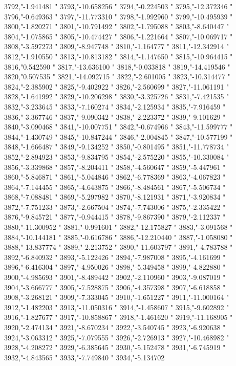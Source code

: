 3792,"-1.941481
"
3793,"-10.658256
"
3794,"-0.224503
"
3795,"-12.372346
"
3796,"-0.649363
"
3797,"-11.773310
"
3798,"-1.992960
"
3799,"-10.495939
"
3800,"-1.820271
"
3801,"-10.791492
"
3802,"-1.795088
"
3803,"-8.640447
"
3804,"-1.075865
"
3805,"-10.474427
"
3806,"-1.221664
"
3807,"-10.069717
"
3808,"-3.597273
"
3809,"-8.947748
"
3810,"-1.164777
"
3811,"-12.342914
"
3812,"-1.910550
"
3813,"-10.813182
"
3814,"-1.147650
"
3815,"-10.964415
"
3816,"0.542590
"
3817,"-13.636100
"
3818,"-0.033818
"
3819,"-14.419546
"
3820,"0.507535
"
3821,"-14.092715
"
3822,"-2.601005
"
3823,"-10.314477
"
3824,"-2.385902
"
3825,"-9.402922
"
3826,"-2.560699
"
3827,"-11.061191
"
3828,"-1.641992
"
3829,"-10.206298
"
3830,"-3.325726
"
3831,"-7.421535
"
3832,"-3.233645
"
3833,"-7.160274
"
3834,"-2.125934
"
3835,"-7.916459
"
3836,"-3.367746
"
3837,"-9.090342
"
3838,"-2.223372
"
3839,"-9.101629
"
3840,"-3.090468
"
3841,"-10.007751
"
3842,"-0.674966
"
3843,"-11.599777
"
3844,"-1.430749
"
3845,"-10.847244
"
3846,"-2.004845
"
3847,"-10.577199
"
3848,"-1.666487
"
3849,"-9.134252
"
3850,"-0.801495
"
3851,"-11.778734
"
3852,"-2.894923
"
3853,"-9.834795
"
3854,"-2.575220
"
3855,"-10.330084
"
3856,"-3.339868
"
3857,"-8.204411
"
3858,"-4.560647
"
3859,"-5.447961
"
3860,"-5.846871
"
3861,"-5.044846
"
3862,"-6.778369
"
3863,"-4.067823
"
3864,"-7.144455
"
3865,"-4.643875
"
3866,"-8.484561
"
3867,"-5.506734
"
3868,"-7.088481
"
3869,"-5.297982
"
3870,"-8.121931
"
3871,"-3.920834
"
3872,"-7.751233
"
3873,"-2.667504
"
3874,"-7.743006
"
3875,"-2.335422
"
3876,"-9.845721
"
3877,"-0.944415
"
3878,"-9.867390
"
3879,"-2.112337
"
3880,"-11.300952
"
3881,"-0.991601
"
3882,"-12.175827
"
3883,"-3.091568
"
3884,"-10.144181
"
3885,"-0.616786
"
3886,"-12.210440
"
3887,"-1.058080
"
3888,"-13.837774
"
3889,"-2.213752
"
3890,"-11.603797
"
3891,"-4.783788
"
3892,"-6.840932
"
3893,"-5.122426
"
3894,"-7.987008
"
3895,"-4.161699
"
3896,"-6.416304
"
3897,"-4.950026
"
3898,"-5.349458
"
3899,"-4.822880
"
3900,"-4.985693
"
3901,"-8.489442
"
3902,"-2.110960
"
3903,"-9.087019
"
3904,"-3.666777
"
3905,"-7.528875
"
3906,"-4.357398
"
3907,"-6.618858
"
3908,"-3.268121
"
3909,"-7.333045
"
3910,"-1.651227
"
3911,"-11.000164
"
3912,"-1.482203
"
3913,"-11.050316
"
3914,"-1.458607
"
3915,"-9.602892
"
3916,"-1.827677
"
3917,"-10.858867
"
3918,"-1.461620
"
3919,"-11.168905
"
3920,"-2.474134
"
3921,"-8.670234
"
3922,"-3.540745
"
3923,"-6.920638
"
3924,"-3.063312
"
3925,"-7.079555
"
3926,"-2.726913
"
3927,"-10.468982
"
3928,"-4.208272
"
3929,"-6.385645
"
3930,"-5.152478
"
3931,"-6.745919
"
3932,"-4.843565
"
3933,"-7.749840
"
3934,"-5.134702
